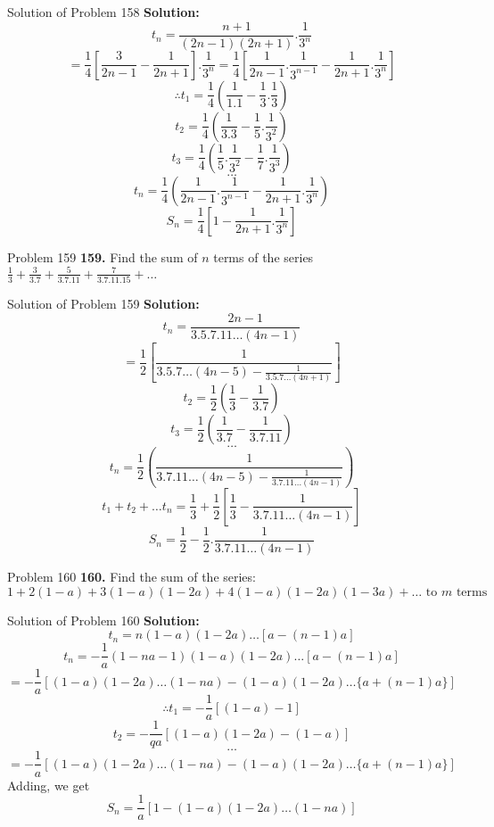 \documentclass[aspectratio=1610,8pt]{beamer}
\begin{document}
\begin{frame}{Solution of Problem 158}
  \textbf{Solution:} $$t_n = \frac{n + 1}{(2n - 1)(2n + 1)}.\frac{1}{3^n}$$
  $$= \frac{1}{4}\left[\frac{3}{2n - 1} - \frac{1}{2n + 1}\right].\frac{1}{3^n} = \frac{1}{4}\left[\frac{1}{2n - 1}.\frac{1}{3^{n -
        1}} - \frac{1}{2n + 1}.\frac{1}{3^n}\right]$$
  $$\therefore t_1 = \frac{1}{4}\left(\frac{1}{1.1} - \frac{1}{3}.\frac{1}{3}\right)$$
  $$t_2 = \frac{1}{4}\left(\frac{1}{3.3} - \frac{1}{5}.\frac{1}{3^2}\right)$$
  $$t_3 = \frac{1}{4}\left(\frac{1}{5}.\frac{1}{3^2} - \frac{1}{7}.\frac{1}{3^3}\right)$$
  $$\ldots$$
  $$t_n = \frac{1}{4}\left(\frac{1}{2n - 1}.\frac{1}{3^{n - 1}} - \frac{1}{2n + 1}.\frac{1}{3^n}\right)$$
  $$S_n = \frac{1}{4}\left[1 - \frac{1}{2n + 1}.\frac{1}{3^n}\right]$$
\end{frame}
\begin{frame}{Problem 159}
  \textbf{159.} Find the sum of $n$ terms of the series $\frac{1}{3} + \frac{3}{3.7} + \frac{5}{3.7.11} + \frac{7}{3.7.11.15} +
  \ldots$
\end{frame}
\begin{frame}{Solution of Problem 159}
  \textbf{Solution:} $$t_n = \frac{2n - 1}{3.5.7.11\ldots (4n - 1)}$$
  $$= \frac{1}{2}\left[\frac{1}{3.5.7\ldots (4n - 5) - \frac{1}{3.5.7\ldots (4n + 1)}}\right]$$
  $$t_2 = \frac{1}{2}\left(\frac{1}{3} - \frac{1}{3.7}\right)$$
  $$t_3 = \frac{1}{2}\left(\frac{1}{3.7} - \frac{1}{3.7.11}\right)$$
  $$\ldots$$
  $$t_n = \frac{1}{2}\left(\frac{1}{3.7.11\ldots(4n - 5) - \frac{1}{3.7.11\ldots(4n - 1)}}\right)$$
  $$t_1 + t_2 + \ldots t_n = \frac{1}{3} + \frac{1}{2}\left[\frac{1}{3} - \frac{1}{3.7.11\ldots (4n - 1)}\right]$$
  $$S_n = \frac{1}{2} - \frac{1}{2}.\frac{1}{3.7.11\ldots(4n - 1)}$$
\end{frame}
\begin{frame}{Problem 160}
  \textbf{160.} Find the sum of the series: $1 + 2(1 - a) + 3(1 - a)(1 - 2a) + 4(1 - a)(1 -2a)(1 - 3a) +
  \ldots\text{~to~}m\text{~terms}$
\end{frame}
\begin{frame}{Solution of Problem 160}
  \textbf{Solution:}$$t_n = n(1 - a)(1 - 2a)\ldots [a - (n - 1)a]$$
  $$t_n = -\frac{1}{a}(1 - na - 1)(1 - a)(1 - 2a)\ldots [a - (n - 1)a]$$
  $$= -\frac{1}{a}[(1 - a)(1 - 2a)\ldots(1 - na) - (1 - a)(1 -2a)\ldots\{a + (n - 1)a\}]$$
  $$\therefore t_1 = -\frac{1}{a}[(1 - a) - 1]$$
  $$t_2 = -\frac{1}{qa}[(1 - a)(1 - 2a) - (1 - a)]$$
  $$\ldots$$
  $$= -\frac{1}{a}[(1 - a)(1 - 2a)\ldots(1 - na) - (1 - a)(1 -2a)\ldots\{a + (n - 1)a\}]$$
  Adding, we get
  $$S_n = \frac{1}{a}[1 - (1 - a)(1 - 2a)\ldots(1 - na)]$$
\end{frame}
\end{document}
